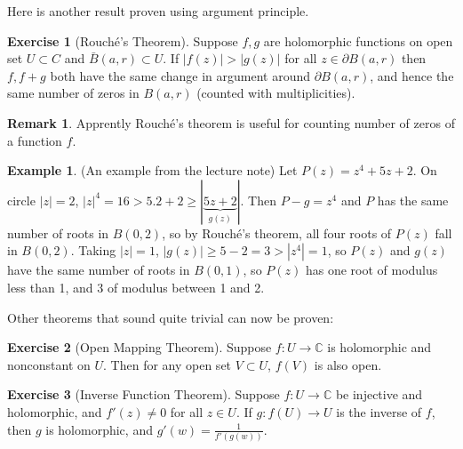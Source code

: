 \documentclass[a4paper, 12pt]{article}
\theoremstyle{definition}
\newtheorem{exercise}{Exercise}
\newtheorem{example}{Example}
\newtheorem{remark}{Remark}
\numberwithin{theorem}{section}
\numberwithin{definition}{section}
\numberwithin{exercise}{section}
\numberwithin{remark}{section}
\numberwithin{figure}{section}
\numberwithin{example}{section}
\newcommand{\C}{\mathbb{C}}
\begin{document}
Here is another result proven using argument principle.
\begin{exercise}[Rouch\'e's Theorem]
    Suppose $f,g$ are holomorphic functions on open set $U \subset C$ and
    $\bar B (a,r) \subset U$.
    If $|f(z)| > |g(z)|$ for all $z \in \partial B(a,r)$ then $f,f+g$ both have the same change in argument around $\partial B (a,r)$, and hence the same number of zeros in $B(a,r)$ (counted with multiplicities).
\end{exercise}
\begin{remark}
    Apprently Rouch\'e's theorem is useful for counting number of zeros of a function $f$.
\end{remark}
\begin{example}
    (An example from the lecture note)
    Let $P(z) = z^4 + 5z + 2$. On circle $|z| = 2$, $|z|^4 = 16 > 5.2 + 2 \geq |\underbrace{5z + 2}_{g(z)}|$.
    Then $P-g = z^4$ and $P$ has the same number of roots in $B(0,2)$,
    so by Rouch\'e's theorem, all four roots of $P(z)$ fall in $B(0,2)$.
    Taking $|z|=1$, $|g(z)| \geq 5 - 2 = 3 > |z^4| = 1$, so
    $P(z)$ and $g(z)$ have the same number of roots in $B(0,1)$, so
    $P(z)$ has one root of modulus less than 1, and 3 of modulus between 1 and 2.
\end{example}
Other theorems that sound quite trivial can now be proven:
\begin{exercise}[Open Mapping Theorem]
    Suppose $f:U \rightarrow \C$ is holomorphic and nonconstant on $U$.
    Then for any open set $V \subset U$, $f(V)$ is also open.
\end{exercise}
\begin{exercise}[Inverse Function Theorem]
    Suppose $f:U \rightarrow \C$ be injective and holomorphic, and $f'(z) \neq 0$ for all $z \in U$.
    If $g: f(U) \rightarrow U$ is the inverse of $f$, then
    $g$ is holomorphic, and $g'(w) = \frac{1}{f'(g(w))}$.
\end{exercise}
\end{document}
